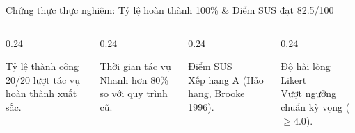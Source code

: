 
\begin{frame}{Chứng thực thực nghiệm: Tỷ lệ hoàn thành 100\% \& Điểm SUS đạt 82.5/100}
  \begin{columns}[T]
    \begin{column}{0.24\textwidth}
      \begin{block}{\centering Tỷ lệ thành công}
        \vskip 1mm
        \\
        \footnotesize 20/20 lượt tác vụ hoàn thành xuất sắc.
        \vskip 1mm
      \end{block}
    \end{column}

    \begin{column}{0.24\textwidth}
      \begin{block}{\centering Thời gian tác vụ}
        \vskip 1mm
        \\
        \footnotesize Nhanh hơn 80\% so với quy trình cũ.
        \vskip 1mm
      \end{block}
    \end{column}

    \begin{column}{0.24\textwidth}
      \begin{block}{\centering Điểm SUS}
        \vskip 1mm
        \\
        \footnotesize Xếp hạng A (Hảo hạng, Brooke 1996).
        \vskip 1mm
      \end{block}
    \end{column}

    \begin{column}{0.24\textwidth}
      \begin{block}{\centering Độ hài lòng Likert}
        \vskip 1mm
        \\
        \footnotesize Vượt ngưỡng chuẩn kỳ vọng ($\ge 4.0$).
        \vskip 1mm
      \end{block}
    \end{column}
  \end{columns}


\end{frame}
